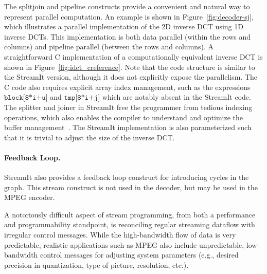 The splitjoin and pipeline constructs provide a convenient and natural
way to represent parallel computation. An example is shown in
Figure~\ref{fig:decoder-sj}, which illustrates a parallel
implementation of the 2D inverse DCT using 1D inverse DCTs. This
implementation is both data parallel (within the rows and columns) and
pipeline parallel (between the rows and columns). 
A straightforward C implementation of a computationally equivalent
inverse DCT is shown in Figure~\ref{fig:idct_creference}. Note that
the code structure is similar to the StreamIt version, although it does 
not explicitly expose the parallelism.
The C code also requires explicit array index management, such as the 
expressions $\texttt{block[8*i+u]}$ and $\texttt{tmp[8*i+j]}$ which are
notably absent in the StreamIt code. 
The splitter and joiner in StreamIt free the programmer from
tedious indexing operations, which also enables the compiler to
understand and optimize the buffer management~\cite{sermulins05lctes}.
The StreamIt implementation is also parameterized such that it is
trivial to adjust the size of the inverse DCT.


\paragraph{Feedback Loop.}
StreamIt also provides a feedback loop construct for introducing
cycles in the graph. This stream construct is not used in the decoder,
but may be used in the MPEG encoder.

\label{sec:messaging}
A notoriously difficult aspect of stream programming, from both a
performance and programmability standpoint, is reconciling regular
streaming dataflow with irregular control messages.  While the
high-bandwidth flow of data is very predictable, realistic
applications such as MPEG also include unpredictable, low-bandwidth
control messages for adjusting system parameters (e.g., desired
precision in quantization, type of picture, resolution, etc.).

